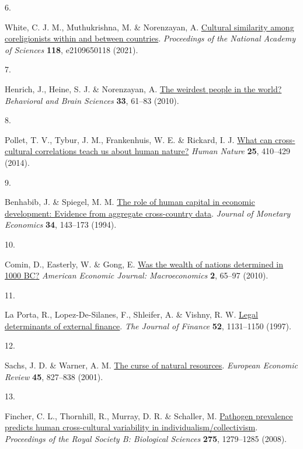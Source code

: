 \documentclass[
  man,floatsintext]{apa6}
\newlength{\cslhangindent}
\newlength{\csllabelwidth}
\newlength{\cslentryspacingunit} %
\newenvironment{CSLReferences}[2] %
 {%
  \setlength{\parindent}{0pt}
  \ifodd #1
  \let\oldpar\par
  \def\par{\hangindent=\cslhangindent\oldpar}
  \fi
  \setlength{\parskip}{#2\cslentryspacingunit}
 }%
 {}
\newcommand{\CSLLeftMargin}[1]{\parbox[t]{\csllabelwidth}{#1}}
\newcommand{\CSLRightInline}[1]{\parbox[t]{\linewidth - \csllabelwidth}{#1}\break}
\begin{document}
\begin{CSLReferences}{0}{0}
\leavevmode{}%
\CSLLeftMargin{6. }%
\CSLRightInline{White, C. J. M., Muthukrishna, M. \& Norenzayan, A. \href{https://doi.org/10.1073/pnas.2109650118}{Cultural similarity among coreligionists within and between countries}. \emph{Proceedings of the National Academy of Sciences} \textbf{118}, e2109650118 (2021).}

\leavevmode{}%
\CSLLeftMargin{7. }%
\CSLRightInline{Henrich, J., Heine, S. J. \& Norenzayan, A. \href{https://doi.org/10.1017/S0140525X0999152X}{The weirdest people in the world?} \emph{Behavioral and Brain Sciences} \textbf{33}, 61--83 (2010).}

\leavevmode{}%
\CSLLeftMargin{8. }%
\CSLRightInline{Pollet, T. V., Tybur, J. M., Frankenhuis, W. E. \& Rickard, I. J. \href{https://doi.org/10.1007/s12110-014-9206-3}{What can cross-cultural correlations teach us about human nature?} \emph{Human Nature} \textbf{25}, 410--429 (2014).}

\leavevmode{}%
\CSLLeftMargin{9. }%
\CSLRightInline{Benhabib, J. \& Spiegel, M. M. \href{https://doi.org/10.1016/0304-3932(94)90047-7}{The role of human capital in economic development: Evidence from aggregate cross-country data}. \emph{Journal of Monetary Economics} \textbf{34}, 143--173 (1994).}

\leavevmode{}%
\CSLLeftMargin{10. }%
\CSLRightInline{Comin, D., Easterly, W. \& Gong, E. \href{http://www.jstor.org/stable/25760309}{Was the wealth of nations determined in 1000 {BC}?} \emph{American Economic Journal: Macroeconomics} \textbf{2}, 65--97 (2010).}

\leavevmode{}%
\CSLLeftMargin{11. }%
\CSLRightInline{La Porta, R., Lopez-De-Silanes, F., Shleifer, A. \& Vishny, R. W. \href{https://doi.org/10.1111/j.1540-6261.1997.tb02727.x}{Legal determinants of external finance}. \emph{The Journal of Finance} \textbf{52}, 1131--1150 (1997).}

\leavevmode{}%
\CSLLeftMargin{12. }%
\CSLRightInline{Sachs, J. D. \& Warner, A. M. \href{https://doi.org/10.1016/S0014-2921(01)00125-8}{The curse of natural resources}. \emph{European Economic Review} \textbf{45}, 827--838 (2001).}

\leavevmode{}%
\CSLLeftMargin{13. }%
\CSLRightInline{Fincher, C. L., Thornhill, R., Murray, D. R. \& Schaller, M. \href{https://doi.org/10.1098/rspb.2008.0094}{Pathogen prevalence predicts human cross-cultural variability in individualism/collectivism}. \emph{Proceedings of the Royal Society B: Biological Sciences} \textbf{275}, 1279--1285 (2008).}


\end{CSLReferences}
\end{document}
